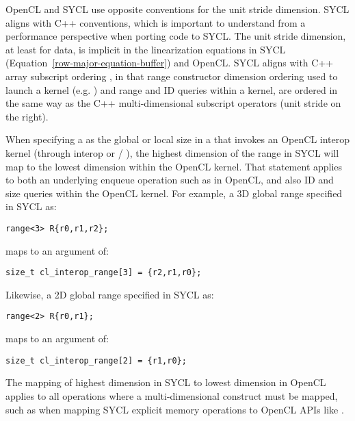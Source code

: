 OpenCL and SYCL use opposite conventions for the unit stride dimension.  SYCL
aligns with C++ conventions, which is important to understand from a performance
perspective when porting code to SYCL.  The unit stride dimension, at least for data, is implicit in the
linearization equations in SYCL (Equation~\ref{row-major-equation-buffer}) and OpenCL.  SYCL aligns with C++ array subscript ordering
, in that range constructor dimension ordering used to launch a kernel
(e.g. ) and range and ID queries within a kernel, are ordered in
the same way as the C++ multi-dimensional subscript operators (unit stride on the right).

When specifying a  as the global or local size
in a  that invokes an OpenCL interop kernel (through
 interop or /
),
the highest dimension of the range in SYCL will map to the
lowest dimension within the OpenCL kernel.  That statement applies to both
an underlying enqueue operation such as 
in OpenCL, and also ID and size queries within the OpenCL kernel.
For example, a 3D global range specified in SYCL as:

\begin{lstlisting}[style=nonumbers]
range<3> R{r0,r1,r2};
\end{lstlisting}

maps to an   argument
of:

\begin{lstlisting}[style=nonumbers]
size_t cl_interop_range[3] = {r2,r1,r0};
\end{lstlisting}

Likewise, a 2D global range specified in SYCL as:

\begin{lstlisting}[style=nonumbers]
range<2> R{r0,r1};
\end{lstlisting}

maps to an   argument
of:

\begin{lstlisting}[style=nonumbers]
size_t cl_interop_range[2] = {r1,r0};
\end{lstlisting}

The mapping of highest dimension in SYCL to lowest dimension in OpenCL applies to all
operations where a multi-dimensional construct must be mapped, such as when mapping SYCL
explicit memory operations to OpenCL APIs like .


